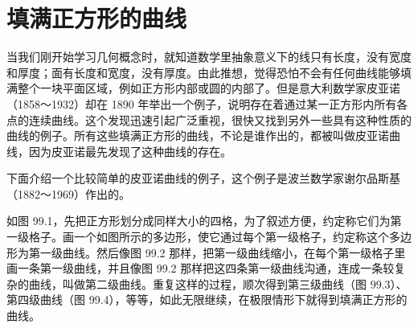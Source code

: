 \section{填满正方形的曲线}

当我们刚开始学习几何概念时，就知道数学里抽象意义下的线只有长度，没有宽度和厚度；面有长度和宽度，没有厚度。由此推想，觉得恐怕不会有任何曲线能够填满整个一块平面区域，例如正方形内部或圆的内部了。但是意大利数学家皮亚诺（1858～1932）却在 1890 年举出一个例子，说明存在着通过某一正方形内所有各点的连续曲线。这个发现迅速引起广泛重视，很快又找到另外一些具有这种性质的曲线的例子。所有这些填满正方形的曲线，不论是谁作出的，都被叫做皮亚诺曲线，因为皮亚诺最先发现了这种曲线的存在。

下面介绍一个比较简单的皮亚诺曲线的例子，这个例子是波兰数学家谢尔品斯基（1882～1969）作出的。

如图 99.1，先把正方形划分成同样大小的四格，为了叙述方便，约定称它们为第一级格子。画一个如图所示的多边形，使它通过每个第一级格子，约定称这个多边形为第一级曲线。然后像图 99.2 那样，把第一级曲线缩小，在每个第一级格子里画一条第一级曲线，并且像图 99.2 那样把这四条第一级曲线沟通，连成一条较复杂的曲线，叫做第二级曲线。重复这样的过程，顺次得到第三级曲线（图 99.3）、第四级曲线（图 99.4），等等，如此无限继续，在极限情形下就得到填满正方形的曲线。

